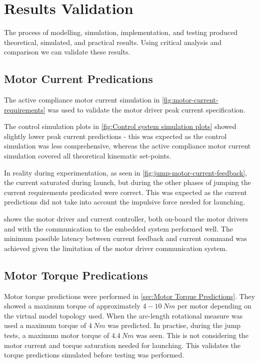 \section{Results Validation}

The process of modelling, simulation, implementation, and testing produced theoretical, simulated, and practical results. Using critical analysis and comparison we can validate these results. 

\subsection{Motor Current Predications}
The active compliance motor current simulation in \cref{fig:motor-current-requirements} was used to validate the motor driver peak current specification. 

The control simulation plots in \cref{fig:Control system simulation plots} showed slightly lower peak current predictions - this was expected as the control simulation was less comprehensive, whereas the active compliance motor current simulation covered all theoretical kinematic set-points. 

In reality during experimentation, as seen in \cref{fig:jump-motor-current-feedback}, the current saturated during launch, but during the other phases of jumping the current requirements predicated were correct. This was expected as the current predictions did not take into account the impulsive force needed for launching.

 shows the motor driver and current controller, both on-board the motor drivers and with the communication to the embedded system performed well. The minimum possible latency between current feedback and current command was achieved given the limitation of the motor driver communication system.

\subsection{Motor Torque Predications}

Motor torque predictions were performed in \cref{sec:Motor Torque Predictions}. They showed a maximum torque of approximately $4-10\ Nm$ per motor depending on the virtual model topology used. When the arc-length rotational measure was used a maximum torque of $4\ Nm$ was predicted. In practise, during the jump tests, a maximum motor torque of $4.4\ Nm$ was seen. This is not considering the motor current and torque saturation needed for launching. This validates the torque predictions simulated before testing was performed. 

